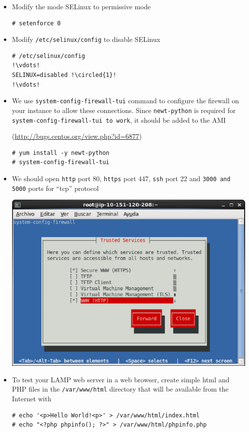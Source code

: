\documentclass{beamer}
\newcommand*\circled[1]{\tikz[baseline=(char.base)]{
            \node[shape=circle,draw,inner sep=2pt] (char) {#1};}}
\newcommand{\outputcommand}[1]{\color{darkgreen}{#1}}
\begin{document}
\begin{frame}
\begin{itemize}
\lstset{language=shell}
\begin{lstlisting}[escapechar=!]
# chkconfig --list httpd
!\outputcommand{httpd           0:off   1:off   2:on    3:on    4:on    5:on    6:off}
\end{lstlisting}

\item Modify the mode SELinux to permissive mode
\lstset{language=shell}
\begin{lstlisting}[escapechar=!]
# setenforce 0
\end{lstlisting}

\item Modify \texttt{/etc/selinux/config} to disable SELinux

\lstset{language=shell}
\begin{lstlisting}[escapechar=!]
# /etc/selinux/config
!\vdots!
SELINUX=disabled !\circled{1}!
!\vdots!
\end{lstlisting}

\item We use \texttt{system-config-firewall-tui} command to configure the firewall on your instance to allow these connections. 
Since \texttt{newt-python} is required for \texttt{system-config-firewall-tui to work}, it should be added to the AMI

(\href{http://bugs.centos.org/view.php?id=6877}{http://bugs.centos.org/view.php?id=6877})
\lstset{language=shell}
\begin{lstlisting}[escapechar=!]
# yum install -y newt-python 
# system-config-firewall-tui
\end{lstlisting}

\item We should open \texttt{http} port 80, \texttt{https} port 447,  \texttt{ssh} port 22 and \texttt{\alert{3000 and 5000}} ports for ``tcp'' protocol
 
\includegraphics[width=0.5 \textwidth]{system-config-firewall-tui.eps}

\item To test your LAMP web server in a web browser,  create simple html and PHP files in the \texttt{/var/www/html} directory that will be available from the Internet with
\lstset{language=shell}
\begin{lstlisting}[escapechar=&]
# echo '<p>Hello World!<p>' > /var/www/html/index.html
# echo "<?php phpinfo(); ?>" > /var/www/html/phpinfo.php
\end{lstlisting}



\end{itemize}
\end{frame}
\end{document}
